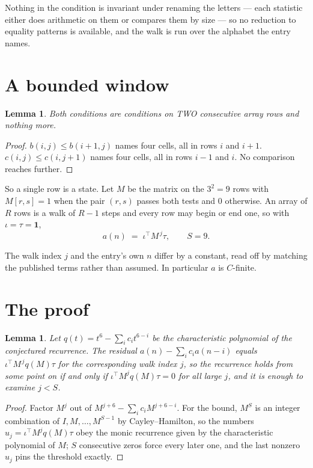 \documentclass[11pt,a4paper]{article}
\theoremstyle{plain}
\newtheorem{lemma}[theorem]{Lemma}
\theoremstyle{definition}
\begin{document}
Nothing in the condition is invariant under renaming the letters --- each statistic either does
arithmetic on them or compares them by size --- so no reduction to equality patterns is
available, and the walk is run over the alphabet the entry names.

\section{A bounded window}

\begin{lemma}\label{lem:win}
Both conditions are conditions on TWO consecutive array rows and nothing more.
\end{lemma}

\begin{proof}
$b(i,j)\le b(i{+}1,j)$ names four cells, all in rows $i$ and $i+1$. $c(i,j)\le c(i,j{+}1)$
names four cells, all in rows $i-1$ and $i$. No comparison reaches further.
\end{proof}

So a single row is a state. Let $M$ be the matrix on the $3^{2}=9$ rows with
$M[r,s]=1$ when the pair $(r,s)$ passes both tests and $0$ otherwise. An array of $R$ rows is a
walk of $R-1$ steps and every row may begin or end one, so with $\iota=\tau=\mathbf{1}$,
\[
a(n)\;=\;\iota^{\!\top}M^{\,j}\tau ,\qquad S=9.
\]

The walk index $j$ and the entry's own $n$ differ by a constant, read off by matching the
published terms rather than assumed. In particular $a$ is $C$-finite.

\section{The proof}

\begin{lemma}\label{lem:crit}
Let $q(t)=t^{6}-\sum_i c_it^{6-i}$ be the characteristic polynomial of the
conjectured recurrence. The residual $a(n)-\sum_ic_ia(n-i)$ equals
$\iota^{\!\top}M^{\,j}q(M)\tau$ for the corresponding walk index $j$, so the recurrence
holds from some point on if and only if $\iota^{\!\top}M^{j}q(M)\tau=0$ for all large $j$,
and it is enough to examine $j<S$.
\end{lemma}

\begin{proof}
Factor $M^{j}$ out of $M^{j+6}-\sum_ic_iM^{j+6-i}$. For the bound, $M^{S}$
is an integer combination of $I,M,\dots,M^{S-1}$ by Cayley--Hamilton, so the numbers
$u_j=\iota^{\!\top}M^{j}q(M)\tau$ obey the monic recurrence given by the characteristic
polynomial of $M$; $S$ consecutive zeros force every later one, and the last nonzero $u_j$
pins the threshold exactly.
\end{proof}
\end{document}
